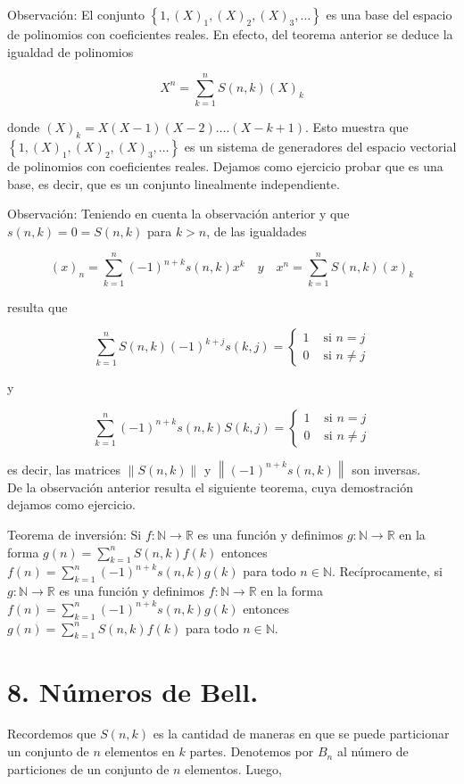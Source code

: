 \documentclass[10pt]{article}
\begin{document}
Observación: El conjunto $\left\{1,(X)_{1},(X)_{2},(X)_{3}, \ldots\right\}$ es una base del espacio de polinomios con coeficientes reales. En efecto, del teorema anterior se deduce la igualdad de polinomios

$$
X^{n}=\sum_{k=1}^{n} S(n, k)(X)_{k}
$$

donde $(X)_{k}=X(X-1)(X-2) \ldots .(X-k+1)$. Esto muestra que $\left\{1,(X)_{1},(X)_{2},(X)_{3}, \ldots\right\}$ es un sistema de generadores del espacio vectorial de polinomios con coeficientes reales. Dejamos como ejercicio probar que es una base, es decir, que es un conjunto linealmente independiente.

Observación: Teniendo en cuenta la observación anterior y que $s(n, k)=0=S(n, k)$ para $k>n$, de las igualdades

$$
(x)_{n}=\sum_{k=1}^{n}(-1)^{n+k} s(n, k) x^{k} \quad y \quad x^{n}=\sum_{k=1}^{n} S(n, k)(x)_{k}
$$

resulta que

$$
\sum_{k=1}^{n} S(n, k)(-1)^{k+j} s(k, j)= \begin{cases}1 & \text { si } n=j \\ 0 & \text { si } n \neq j\end{cases}
$$

y

$$
\sum_{k=1}^{n}(-1)^{n+k} s(n, k) S(k, j)= \begin{cases}1 & \text { si } n=j \\ 0 & \text { si } n \neq j\end{cases}
$$

es decir, las matrices $\|S(n, k)\|$ y $\left\|(-1)^{n+k} s(n, k)\right\|$ son inversas.\\
De la observación anterior resulta el siguiente teorema, cuya demostración dejamos como ejercicio.

Teorema de inversión: Si $f: \mathbb{N} \longrightarrow \mathbb{R}$ es una función y definimos $g: \mathbb{N} \longrightarrow \mathbb{R}$ en la forma $g(n)=\sum_{k=1}^{n} S(n, k) f(k)$ entonces $f(n)=\sum_{k=1}^{n}(-1)^{n+k} s(n, k) g(k)$ para todo $n \in \mathbb{N}$. Recíprocamente, si $g: \mathbb{N} \longrightarrow \mathbb{R}$ es una función y definimos $f: \mathbb{N} \longrightarrow \mathbb{R}$ en la forma $f(n)=\sum_{k=1}^{n}(-1)^{n+k} s(n, k) g(k)$ entonces $g(n)=\sum_{k=1}^{n} S(n, k) f(k)$ para todo $n \in \mathbb{N}$.

\section*{8. Números de Bell.}
Recordemos que $S(n, k)$ es la cantidad de maneras en que se puede particionar un conjunto de $n$ elementos en $k$ partes. Denotemos por $B_{n}$ al número de particiones de un conjunto de $n$ elementos. Luego,
\end{document}

